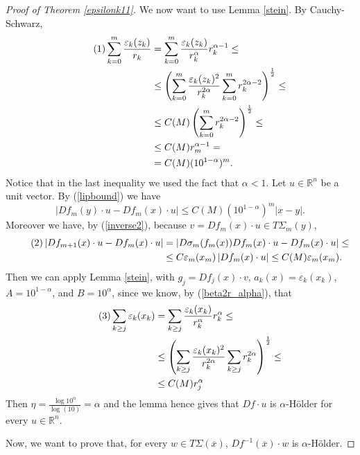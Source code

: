 \documentclass[11pt, twoside, leqno]{article}
\numberwithin{equation}{section}
\newcommand\numberthis{\addtocounter{equation}{1}\tag{\theequation}}
\theoremstyle{plain}
\theoremstyle{definition}
\newcommand{\R}{\mathbb{R}}
\newcommand{\e}{\varepsilon} %
\begin{document}
\begin{proof}[Proof of Theorem \ref{epsilonk11}]
We now want to use Lemma \ref{stein}. By Cauchy-Schwarz,
\begin{align*} \numberthis
 \sum_{k=0}^m  \frac{\e_k(z_k)}{r_k} & = \sum_{k=0}^m  \frac{\e_k(z_k)}{r_k^{\alpha}} r_k^{\alpha-1}\leq \\
 & \leq  \left(\sum_{k=0}^m  \frac{\e_k(z_k)^2}{r_k^{2\alpha}} \sum_{k=0}^m r_k^{2\alpha-2}\right)^{\frac12} \leq \\
 & \leq C(M) \left( \sum_{k=0}^m r_k^{2\alpha-2}\right)^{\frac12} \leq \\
 & \leq C(M)r_m^{\alpha-1} = \\
 & = C(M)(10^{1-\alpha})^m.
\end{align*}
Notice that in the last inequality we used the fact that $\alpha<1$.
Let $u \in \R^n$ be a unit vector. By (\ref{lipbound}) we have
\begin{equation}
\left|Df_m(y)\cdot u -Df_m(x)\cdot u \right| \leq C(M)(10^{1-\alpha})^m|x-y|.
\end{equation}
Moreover we have, by (\ref{inverse2}), because $v=Df_m(x)\cdot u \in T\Sigma_m(y)$,
\begin{align*} \numberthis
\left|Df_{m+1}(x)\cdot u -Df_m(x)\cdot u\right| & =\left| D\sigma_m(f_m(x))Df_m(x)\cdot u-Df_m(x)\cdot u \right| \leq \\
& \leq C \e_m(x_m) \left| Df_m(x)\cdot u \right| \leq C(M)  \e_m(x_m).
\end{align*}
Then we can apply Lemma \ref{stein}, with $g_j=Df_j(x)\cdot v$, $a_k(x)=  \e_k(x_k)$, $A=10^{1-\alpha}$, and $B=10^{\alpha}$, since we know, by (\ref{beta2r_alpha}), that
\begin{align*} \numberthis
\sum_{k\geq j}  \e_k(x_k) & = \sum_{k\geq j}  \frac{ \e_k(x_k)}{r_k^{\alpha}}r_k^{\alpha} \leq \\
& \leq \left( \sum_{k\geq j}  \frac{ \e_k(x_k)^2}{r_k^{2\alpha}}\sum_{k\geq j}r_k^{2\alpha}\right)^{\frac12} \leq \\
& \leq C(M) r_j^{\alpha}
\end{align*}
Then $\eta=\frac{\log 10^{\alpha}}{\log(10)}=\alpha$ and the lemma hence gives that $Df\cdot u$ is $\alpha$-H\"{o}lder for every $u \in \R^n$.


Now, we want to prove that, for every $w \in T\Sigma(\overline{x})$, $Df^{-1}(\overline{x})\cdot w$ is $\alpha$-H\"older.



\end{proof}
\end{document}

